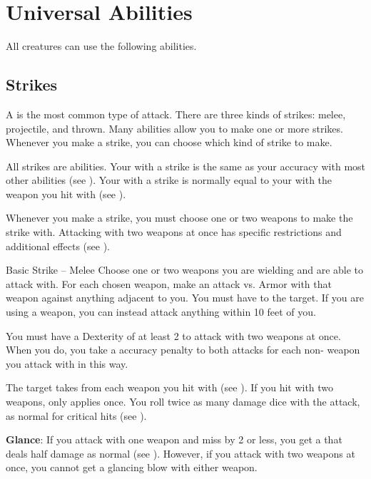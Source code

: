 \section{Universal Abilities}\label{Universal Abilities}
    All creatures can use the following abilities.

    \subsection{Strikes}\label{Strikes}
        A  is the most common type of attack.
        There are three kinds of strikes: melee, projectile, and thrown.
        Many abilities allow you to make one or more strikes.
        Whenever you make a strike, you can choose which kind of strike to make.

        All strikes are  abilities.
        Your  with a strike is the same as your accuracy with most other abilities (see ).
        Your  with a strike is normally equal to your  with the weapon you hit with (see ).

        Whenever you make a strike, you must choose one or two weapons to make the strike with.
        Attacking with two weapons at once has specific restrictions and additional effects (see ).

        \begin{activeability}{Basic Strike -- Melee}
            \label{Melee Strike}
            \rankline
            Choose one or two weapons you are wielding and are able to attack with.
            For each chosen weapon, make an attack vs. Armor with that weapon against anything adjacent to you.
            You must have  to the target.
            If you are using a  weapon, you can instead attack anything within 10 feet of you.

            You must have a Dexterity of at least 2 to attack with two weapons at once.
            When you do, you take a  accuracy penalty to both attacks for each non- weapon you attack with in this way.

            \hit The target takes  from each weapon you hit with (see ).
            If you hit with two weapons,  only applies once.
            \crit You roll twice as many damage dice with the attack, as normal for critical hits (see ).
            \par \textbf{Glance}: If you attack with one weapon and miss by 2 or less, you get a  that deals half damage as normal (see ).
            However, if you attack with two weapons at once, you cannot get a glancing blow with either weapon.
        \end{activeability}

